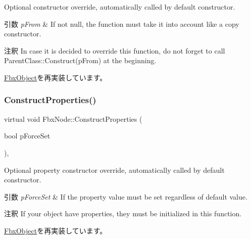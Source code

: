Optional constructor override, automatically called by default constructor. 
\begin{DoxyParams}{引数}
{\em p\+From} & If not null, the function must take it into account like a copy constructor. \\
\hline
\end{DoxyParams}
\begin{DoxyRemark}{注釈}
In case it is decided to override this function, do not forget to call Parent\+Class\+::\+Construct(p\+From) at the beginning. 
\end{DoxyRemark}


\hyperlink{class_fbx_object_a313503bc645af3fdceb4a99ef5cea7eb}{Fbx\+Object}を再実装しています。

\mbox{\label{class_fbx_node_ae4391b51da92a665fb905ec9e6295b7d}} 
\subsubsection{\texorpdfstring{Construct\+Properties()}{ConstructProperties()}}
{\footnotesize\ttfamily virtual void Fbx\+Node\+::\+Construct\+Properties (\begin{DoxyParamCaption}\item[{bool}]{p\+Force\+Set }\end{DoxyParamCaption})\hspace{0.3cm}{\ttfamily [protected]}, {\ttfamily [virtual]}}

Optional property constructor override, automatically called by default constructor. 
\begin{DoxyParams}{引数}
{\em p\+Force\+Set} & If the property value must be set regardless of default value. \\
\hline
\end{DoxyParams}
\begin{DoxyRemark}{注釈}
If your object have properties, they must be initialized in this function. 
\end{DoxyRemark}


\hyperlink{class_fbx_object_ad44f814323dc1b5e78bff1bfc608b4bb}{Fbx\+Object}を再実装しています。

\mbox{\label{class_fbx_node_a175cffa28c7d85de8cb976599060b68a}} 
